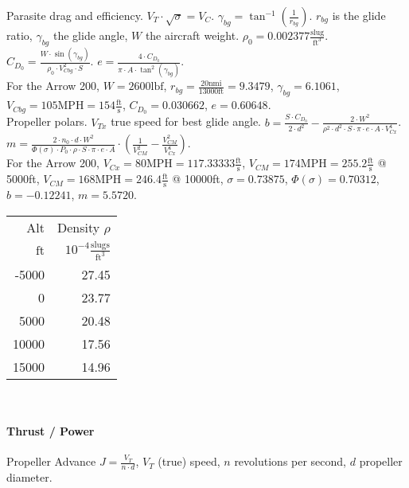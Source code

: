 \documentclass[a4paper,10pt,pdftex]{article}
\begin{document}
Parasite drag and efficiency. $V_T\cdot\sqrt{\sigma}=V_C$. $\gamma_{bg}=\tan^{-1}(\frac{1}{r_{bg}})$.
$r_{bg}$ is the glide ratio, $\gamma_{bg}$ the glide angle, $W$ the aircraft weight.
$\rho_0=0.002377\frac{\mathrm{slug}}{\mathrm{ft}^3}$.
$C_{D_0}=\frac{W\cdot{}\sin(\gamma_{bg})}{\rho_0\cdot{}V_{Cbg}^2\cdot{}S}$.
$e=\frac{4\cdot{}C_{D_0}}{\pi\cdot{}A\cdot\tan^2(\gamma_{bg})}$. \\

For the Arrow 200, $W=2600\mathrm{lbf}$, $r_{bg}=\frac{20\mathrm{nmi}}{13000\mathrm{ft}}=9.3479$,
$\gamma_{bg}=6.1061$, $V_{Cbg}=105\mathrm{MPH}=154\frac{\mathrm{ft}}{\mathrm{s}}$,
$C_{D_0}=0.030662$, $e=0.60648$. \\

Propeller polars. $V_{Tx}$ true speed for best glide angle.
$b=\frac{S\cdot{}C_{D_0}}{2\cdot{}d^2}-\frac{2\cdot{}W^2}{\rho^2\cdot{}d^2\cdot{}S\cdot\pi\cdot{}e\cdot{}A\cdot{}V_{Cx}^4}$.
$m=\frac{2\cdot{}n_0\cdot{}d\cdot{}W^2}{\Phi(\sigma)\cdot{}P_0\cdot\rho\cdot{}S\cdot\pi\cdot{}e\cdot{}A}\cdot\left(\frac{1}{V_{CM}^2}-\frac{V_{CM}^2}{V_{Cx}^4}\right)$. \\

For the Arrow 200, $V_{Cx}=80\mathrm{MPH}=117.33333\frac{\mathrm{ft}}{\mathrm{s}}$,
$V_{CM}=174\mathrm{MPH}=255.2\frac{\mathrm{ft}}{\mathrm{s}}$ @ 5000ft,
$V_{CM}=168\mathrm{MPH}=246.4\frac{\mathrm{ft}}{\mathrm{s}}$ @ 10000ft, $\sigma=0.73875$,
$\Phi(\sigma)=0.70312$, $b=-0.12241$, $m=5.5720$. \\


\noindent\begin{tabular}{rr}
Alt & Density $\rho$ \\
$\mathrm{ft}$ & $10^{-4}\frac{\mathrm{slugs}}{\mathrm{ft}^3}$ \\
-5000 &	27.45 \\
0     &	23.77 \\
5000  &	20.48 \\
10000 &	17.56 \\
15000 &	14.96 \\
\end{tabular} \\

\paragraph{Thrust / Power}

Propeller Advance $J=\frac{V_T}{n\cdot{}d}$, $V_T$ (true) speed, $n$ revolutions per second, $d$ propeller diameter.\\
\end{document}
